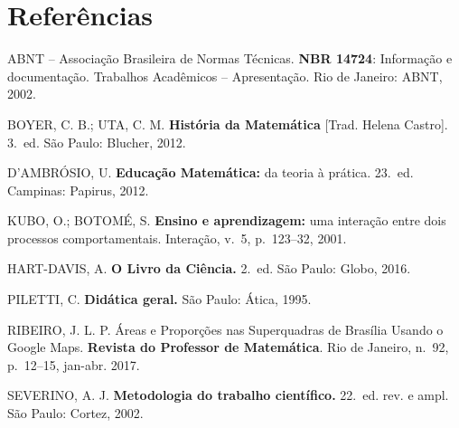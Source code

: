 \clearpage
\begingroup
\singlespacing
\chapter*{Referências}

\noindent
ABNT -- Associação Brasileira de Normas Técnicas. \textbf{NBR 14724}:
Informação e documentação. Trabalhos Acadêmicos -- Apresentação. Rio de
Janeiro: ABNT, 2002.

\vspace{0.5\baselineskip}

\noindent
BOYER, C. B.; UTA, C. M. \textbf{História da Matemática} [Trad. Helena
Castro]. 3.~ed. São Paulo: Blucher, 2012.

\vspace{0.5\baselineskip}

\noindent
D'AMBRÓSIO, U. \textbf{Educação Matemática:} da teoria à prática. 23.~ed.
Campinas: Papirus, 2012.

\vspace{0.5\baselineskip}

\noindent
KUBO, O.; BOTOMÉ, S. \textbf{Ensino e aprendizagem:} uma interação entre
dois processos comportamentais. Interação, v.~5, p.~123--32, 2001.

\vspace{0.5\baselineskip}

\noindent
HART-DAVIS, A. \textbf{O Livro da Ciência.} 2.~ed. São Paulo: Globo, 2016.

\vspace{0.5\baselineskip}

\noindent
PILETTI, C. \textbf{Didática geral.} São Paulo: Ática, 1995.

\vspace{0.5\baselineskip}

\noindent
RIBEIRO, J. L. P. Áreas e Proporções nas Superquadras de Brasília Usando o
Google Maps. \textbf{Revista do Professor de Matemática}. Rio de Janeiro,
n.~92, p.~12--15, jan-abr. 2017.

\vspace{0.5\baselineskip}

\noindent
SEVERINO, A. J. \textbf{Metodologia do trabalho científico.} 22.~ed. rev. e
ampl. São Paulo: Cortez, 2002.
\endgroup
